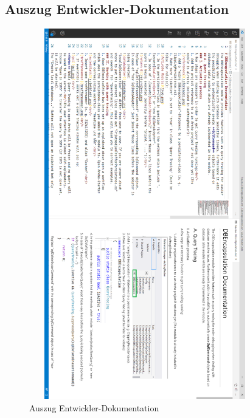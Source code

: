 \documentclass[11pt,toc=sectionentrywithoutdots, 
headheight=44pt, headings=optiontoheadandtoc, hyperfootnotes=false, hypertexnames=false]{scrartcl}
\begin{document}
\subsection{Auszug Entwickler-Dokumentation}
 \label{fig:Dokumentation}
 \begin{figure}[H]
 \centering

	\includegraphics[height=610, width=380]{doku.png}
	 \caption{Auszug Entwickler-Dokumentation}
 \end{figure}
\end{document}
